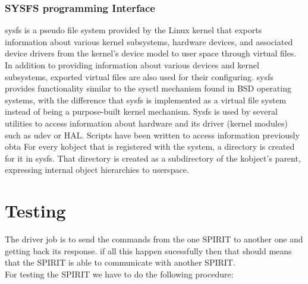 \subsubsection{SYSFS programming Interface}
sysfs is a pseudo file system provided by the Linux kernel that exports information about various kernel subsystems, hardware devices, and associated device drivers from the kernel's device model to user space through virtual files. In addition to providing information about various devices and kernel subsystems, exported virtual files are also used for their configuring. sysfs provides functionality similar to the sysctl mechanism found in BSD operating systems, with the difference that sysfs is implemented as a virtual file system instead of being a purpose-built kernel mechanism. Sysfs is used by several utilities to access information about hardware and its driver (kernel modules) such as udev or HAL. Scripts have been written to access information previously obta For every kobject that is registered with the system, a directory is created for it in sysfs. That directory is created as a subdirectory of the kobject's parent, expressing internal object hierarchies to userspace. %
\section{Testing}
The driver job is to send the commands from the one SPIRIT to another one and getting back its response. if all this happen sucessfully then that should means that the SPIRIT is able to communicate with another SPIRIT.\\
For testing the SPIRIT we have to do the following procedure:
